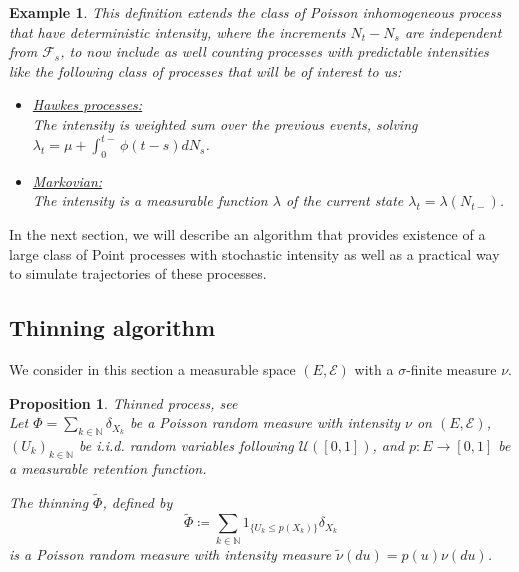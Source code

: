 \documentclass{article} %
\newtheorem{proposition}[theorem]{Proposition}
\newtheorem{example}[theorem]{Example}
\newcommand{\1}{\mathbbm{1}} %
\begin{document}
\begin{example}
    This definition extends the class of Poisson inhomogeneous process that have deterministic intensity, where the increments $N_t - N_s$ are independent from $\mathcal{F}_s$, to now include as well counting processes with predictable intensities like the following class of processes that will be of interest to us:
    \begin{itemize}
        \item \underline{Hawkes processes:}\\
        The intensity is weighted sum over the previous events, solving $\lambda_t = \mu + \int_0^{t-} \phi(t-s)dN_s$.
        \item \underline{Markovian:} \\
        The intensity is a measurable function $\lambda$ of the current state $\lambda_t = \lambda(N_{t-})$.
    \end{itemize}
\end{example}

In the next section, we will describe an algorithm that provides existence of a large class of Point processes with stochastic intensity as well as a practical way to simulate trajectories of these processes.

\subsection{Thinning algorithm}

We consider in this section a measurable space $(E, \mathcal{E})$ with a $\sigma$-finite measure $\nu$.

\begin{proposition}\textit{Thinned process}, see \cite[Prop. 2.2.6.]{RPG}
    \leavevmode \\
    Let $\Phi = \sum_{k \in \mathbb{N}} \delta_{X_k}$ be a Poisson random measure with intensity $\nu$ on $(E, \mathcal{E})$, $(U_k)_{k \in \mathbb{N}}$ be i.i.d. random variables following $\mathcal{U}([0,1])$, and $p: E \to [0,1]$ be a measurable retention function.
    
    The thinning $\tilde{\Phi}$, defined by
    \[
    \tilde{\Phi} \coloneqq \sum_{k \in \mathbb{N}} 1_{\{U_k \leq p(X_k)\}} \delta_{X_k}
    \]
    is a Poisson random measure with intensity measure $\tilde{\nu}(du) = p(u) \nu(du)$.
\end{proposition}
\end{document}
